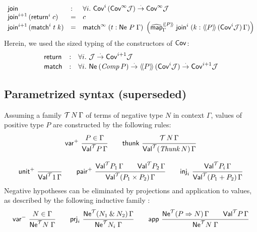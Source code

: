 \documentclass[a4paper,USenglish,cleveref, autoref]{lipics-v2019}
\begin{document}
\[
\begin{array}{lll}
  \tjoin & : & \forall i.\
    \Cov[i]\,(\Cov[\infty]\J) \todot \Cov[\infty]\J  \\
  \tjoin[i+1]\,(\treturn[i]\;c) & = & c \\
  \tjoin[i+1]\,(\tmatch^i\;t\;k)
    & = & \tmatch^\infty\;
     (t : \Ne P \Gamma)\;
     \left(\stmap[\Add P]_\Gamma\;\tjoin[i]\;(k : \AddHypP P {\Cov[i]\J} \Gamma)\right) \\
\end{array}
\]
Herein, we used the sized typing of the constructors of $\Cov$:
\[
\begin{array}{lll}
  \treturn & : & \forall i.\ \J \todot \Cov[i+1] \J \\
  \tmatch  & : & \forall i.\
    \tNe\,(\Comp P) \todot \Add P\,(\Cov[i]\J) \todot \Cov[i+1]\J \\
\end{array}
\]




\clearpage

\subsection{Parametrized syntax (superseded)}

Assuming a family $\T\,N\,\Gamma$ of terms of negative type $N$ in
context $\Gamma$, values 
of positive type $P$ are constructed by the
following rules:
\begin{gather*}
  \nru{\pvar}{P \in \Gamma}{\PValT P \Gamma}
\qquad
  \nru{\tthunk}{\T\,N\,\Gamma}{\PValTP{\Thunk N}\Gamma}
\\[2ex]
  \nru{\punit}{}{\PValT{\tyone}\Gamma}
\qquad
  \nru{\ppair}
      {\PValT{P_1}\Gamma \qquad \PValT{P_2}\Gamma}
      {\PValTP{P_1 \times P_2}\Gamma}
\qquad
  \nru{\tinj_i}{\PValT{P_i}\Gamma}{\PValTP{P_1 + P_2}\Gamma}
\end{gather*}
Negative hypotheses can be eliminated by projections and application
to values, as described by the following inductive family
\fbox{$\NeT N \Gamma$}:
\begin{gather*}
  \nru{\nvar}{N \in \Gamma}{\NeT N \Gamma}
\qquad
  \nru{\tprj_i}
      {\NeTP {N_1 \ntimes N_2} \Gamma}
      {\NeT {N_i} \Gamma}
\qquad
  \nru{\tapp}
      {\NeTP {P \To N} \Gamma \qquad \PValT P \Gamma}
      {\NeT N \Gamma}
\end{gather*}
\end{document}

